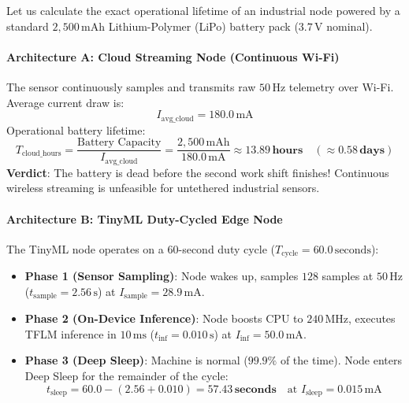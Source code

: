\begin{example}
Let us calculate the exact operational lifetime of an industrial node powered by a standard $2{,}500\,\text{mAh}$ Lithium-Polymer (LiPo) battery pack ($3.7\,\text{V}$ nominal).

\paragraph{Architecture A: Cloud Streaming Node (Continuous Wi-Fi)}
The sensor continuously samples and transmits raw $50\,\text{Hz}$ telemetry over Wi-Fi. Average current draw is:
\begin{equation*}
I_{\text{avg\_cloud}} = 180.0\,\text{mA}
\end{equation*}
Operational battery lifetime:
\begin{equation*}
T_{\text{cloud\_hours}} = \frac{\text{Battery Capacity}}{I_{\text{avg\_cloud}}} = \frac{2{,}500\,\text{mAh}}{180.0\,\text{mA}} \approx \mathbf{13.89\,\text{hours}} \quad (\approx \mathbf{0.58\,\text{days}})
\end{equation*}
\textbf{Verdict}: The battery is dead before the second work shift finishes! Continuous wireless streaming is unfeasible for untethered industrial sensors.

\paragraph{Architecture B: TinyML Duty-Cycled Edge Node}
The TinyML node operates on a $60$-second duty cycle ($T_{\text{cycle}} = 60.0\,\text{seconds}$):
\begin{itemize}
    \item \textbf{Phase 1 (Sensor Sampling)}: Node wakes up, samples $128$ samples at $50\,\text{Hz}$ ($t_{\text{sample}} = 2.56\,\text{s}$) at $I_{\text{sample}} = 28.9\,\text{mA}$.
    \item \textbf{Phase 2 (On-Device Inference)}: Node boosts CPU to $240\,\text{MHz}$, executes TFLM inference in $10\,\text{ms}$ ($t_{\text{inf}} = 0.010\,\text{s}$) at $I_{\text{inf}} = 50.0\,\text{mA}$.
    \item \textbf{Phase 3 (Deep Sleep)}: Machine is normal ($99.9\%$ of the time). Node enters Deep Sleep for the remainder of the cycle:
    \begin{equation*}
    t_{\text{sleep}} = 60.0 - (2.56 + 0.010) = \mathbf{57.43\,\text{seconds}} \quad \text{at } I_{\text{sleep}} = 0.015\,\text{mA}
    \end{equation*}
\end{itemize}


\end{example}
